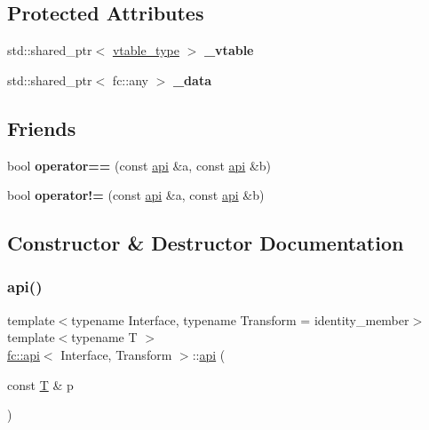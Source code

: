 \subsection*{Protected Attributes}
\begin{DoxyCompactItemize}
\item 
\mbox{\label{classfc_1_1api_ad1617b790322c5a8e41f2af06c88c0e6}} 
std\+::shared\+\_\+ptr$<$ \mbox{\hyperlink{structfc_1_1vtable}{vtable\+\_\+type}} $>$ {\bfseries \+\_\+vtable}
\item 
\mbox{\label{classfc_1_1api_a8f70f7e0e85f5fa0a7ab1f5667f3a88f}} 
std\+::shared\+\_\+ptr$<$ fc\+::any $>$ {\bfseries \+\_\+data}
\end{DoxyCompactItemize}
\subsection*{Friends}
\begin{DoxyCompactItemize}
\item 
\mbox{\label{classfc_1_1api_a200d5382cff45db8633a0fc427650338}} 
bool {\bfseries operator==} (const \mbox{\hyperlink{classfc_1_1api}{api}} \&a, const \mbox{\hyperlink{classfc_1_1api}{api}} \&b)
\item 
\mbox{\label{classfc_1_1api_abc65e9cb0c531a4fe0ba91ee2eea6644}} 
bool {\bfseries operator!=} (const \mbox{\hyperlink{classfc_1_1api}{api}} \&a, const \mbox{\hyperlink{classfc_1_1api}{api}} \&b)
\end{DoxyCompactItemize}


\subsection{Constructor \& Destructor Documentation}
\mbox{\label{classfc_1_1api_aa98da82a201c30c8efd4cad46c878a8b}} 
\subsubsection{\texorpdfstring{api()}{api()}}
{\footnotesize\ttfamily template$<$typename Interface, typename Transform = identity\+\_\+member$>$ \\
template$<$typename T $>$ \\
\mbox{\hyperlink{classfc_1_1api}{fc\+::api}}$<$ Interface, Transform $>$\+::\mbox{\hyperlink{classfc_1_1api}{api}} (\begin{DoxyParamCaption}\item[{const \mbox{\hyperlink{struct_t}{T}} \&}]{p }\end{DoxyParamCaption})\hspace{0.3cm}{\ttfamily [inline]}}


